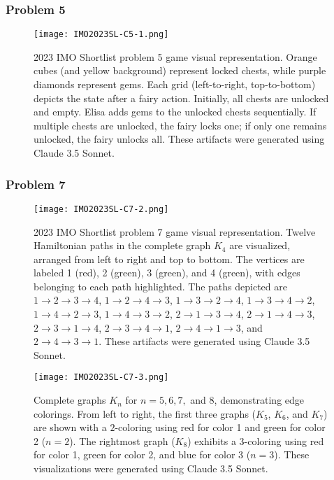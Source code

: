 \newpage
\clearpage
\subsubsection*{Problem 5}
\label{appendix:G_2023_IMO_Shortlist_C5}

\begin{figure}[htb]
\texttt{[image: IMO2023SL-C5-1.png]}
\caption{2023 IMO Shortlist problem 5 game visual representation. Orange cubes (and yellow background) represent locked chests, while purple diamonds represent gems. Each grid (left-to-right, top-to-bottom) depicts the state after a fairy action. Initially, all chests are unlocked and empty. Elisa adds gems to the unlocked chests sequentially. If multiple chests are unlocked, the fairy locks one; if only one remains unlocked, the fairy unlocks all. These artifacts were generated using Claude 3.5 Sonnet.} 
\end{figure}




\newpage
\clearpage

\subsubsection*{Problem 7}
\label{appendix:G_2023_IMO_Shortlist_C7}

\begin{figure}[htb]
\texttt{[image: IMO2023SL-C7-2.png]}
\caption{2023 IMO Shortlist problem 7 game visual representation. Twelve Hamiltonian paths in the complete graph \( K_4 \) are visualized, arranged from left to right and top to bottom. The vertices are labeled 1 (red), 2 (green), 3 (green), and 4 (green), with edges belonging to each path highlighted. The paths depicted are \( 1 \rightarrow 2 \rightarrow 3 \rightarrow 4 \), \( 1 \rightarrow 2 \rightarrow 4 \rightarrow 3 \), \( 1 \rightarrow 3 \rightarrow 2 \rightarrow 4 \), \( 1 \rightarrow 3 \rightarrow 4 \rightarrow 2 \), \( 1 \rightarrow 4 \rightarrow 2 \rightarrow 3 \), \( 1 \rightarrow 4 \rightarrow 3 \rightarrow 2 \), \( 2 \rightarrow 1 \rightarrow 3 \rightarrow 4 \), \( 2 \rightarrow 1 \rightarrow 4 \rightarrow 3 \), \( 2 \rightarrow 3 \rightarrow 1 \rightarrow 4 \), \( 2 \rightarrow 3 \rightarrow 4 \rightarrow 1 \), \( 2 \rightarrow 4 \rightarrow 1 \rightarrow 3 \), and \( 2 \rightarrow 4 \rightarrow 3 \rightarrow 1 \). These artifacts were generated using Claude 3.5 Sonnet.} \label{k_4}
\end{figure}

\begin{figure}[htb]
\texttt{[image: IMO2023SL-C7-3.png]}
\caption{Complete graphs $K_n$ for $n = 5, 6, 7,$ and $8$, demonstrating edge colorings. From left to right, the first three graphs ($K_5$, $K_6$, and $K_7$) are shown with a $2$-coloring using red for color 1 and green for color 2 ($n=2$). The rightmost graph ($K_8$) exhibits a $3$-coloring using red for color 1, green for color 2, and blue for color 3 ($n=3$). These visualizations were generated using Claude 3.5 Sonnet.} \label{k_5_6_7_8}
\end{figure}

